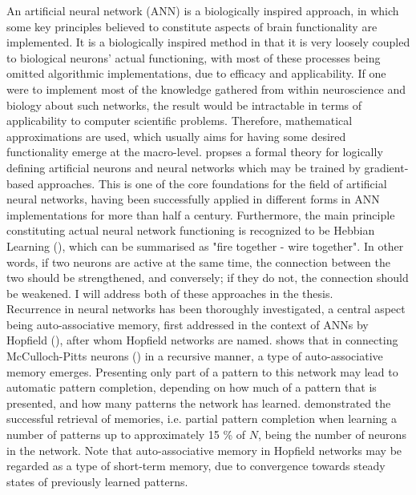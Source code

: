 An artificial neural network (ANN) is a biologically inspired approach, in which some key principles believed to constitute aspects of brain functionality are implemented. It is a biologically inspired method in that it is very loosely coupled to biological neurons' actual functioning, with most of these processes being omitted algorithmic implementations, due to efficacy and applicability. If one were to implement most of the knowledge gathered from within neuroscience and biology about such networks, the result would be intractable in terms of applicability to computer scientific problems. Therefore, mathematical approximations are used, which usually aims for having some desired functionality emerge at the macro-level. \cite{McCulloch1943} propses a formal theory for logically defining artificial neurons and neural networks which may be trained by gradient-based approaches. This is one of the core foundations for the field of artificial neural networks, having been successfully applied in different forms in ANN implementations for more than half a century.
Furthermore, the main principle constituting actual neural network functioning is recognized to be Hebbian Learning (\cite{Hebb1949}), which can be summarised as "fire together - wire together". In other words, if two neurons are active at the same time, the connection between the two should be strengthened, and conversely; if they do not, the connection should be weakened.
I will address both of these approaches in the thesis.
\\

Recurrence in neural networks has been thoroughly investigated, a central aspect being auto-associative memory, first addressed in the context of ANNs by Hopfield (\cite{Hopfield1982}), after whom Hopfield networks are named. \cite{Hopfield1982} shows that in connecting McCulloch-Pitts neurons (\cite{McCulloch1943}) in a recursive manner, a type of auto-associative memory emerges. Presenting only part of a pattern to this network may lead to automatic pattern completion, depending on how much of a pattern that is presented, and how many patterns the network has learned. \cite{Hopfield1982} demonstrated the successful retrieval of memories, i.e. partial pattern completion when learning a number of patterns up to approximately 15 \% of $N$, being the number of neurons in the network. Note that auto-associative memory in Hopfield networks may be regarded as a type of short-term memory, due to convergence towards steady states of previously learned patterns.

